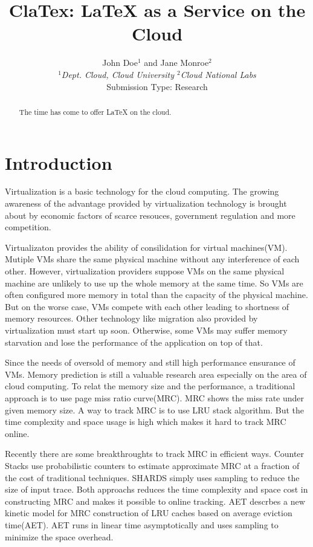 \documentclass[10pt,twocolumn]{article}
\begin{document}
	
	\title{ClaTex: LaTeX as a Service on the Cloud}
	\author{John Doe$^1$ and Jane Monroe$^2$ \\
		\small {\em  $^1$Dept. Cloud, Cloud University \quad
			$^2$Cloud National Labs} \\ [2mm]
		\small Submission Type: Research
	}
	\date{}
	\maketitle
	
	\begin{abstract}
		The time has come to offer LaTeX on the cloud.
	\end{abstract}
	
	\section{Introduction}
	Virtualization is a basic technology for the cloud computing. The growing awareness of the advantage provided by virtualization technology is brought about by economic factors of scarce resouces, government regulation and more competition.
	
	Virtualizaton provides the ability of consilidation for virtual machines(VM). Mutiple VMs share the same physical machine without any interference of each other. However, virtualization providers suppose VMs on the same physical machine are unlikely to use up the whole memory at the same time. So VMs are often configured more memory in total than the capacity of the physical machine. But on the worse case, VMs compete with each other leading to shortness of memory resources. Other technology like migration also provided by virtualization must start up soon. Otherwise, some VMs may suffer memory starvation and lose the performance of the application on top of that.
	
	
	
	Since the needs of oversold of memory and still high performance ensurance of VMs. Memory prediction is still a valuable research area especially on the area of cloud computing. To relat the memory size and the performance, a traditional approach is to use page miss ratio curve(MRC). MRC shows the miss rate under given memory size. A way to track MRC is to use LRU stack algorithm\cite{Mattson1970Evaluation}. But the time complexity and space usage is high which makes it hard to track MRC online.
	
	Recently there are some breakthroughts to track MRC in efficient ways. Counter Stacks\cite{Wires2014Characterizing} use probabilistic counters to estimate approximate MRC at a fraction of the cost of traditional techniques. SHARDS\cite{shards} simply uses sampling to reduce the size of input trace. Both approachs reduces the time complexity and space cost in constructing MRC and makes it possible to online tracking. AET\cite{aet} descrbes a new kinetic model for MRC construction of LRU caches based on average eviction time(AET). AET runs in linear time asymptotically and uses sampling to minimize the space overhead.
	
\end{document}
